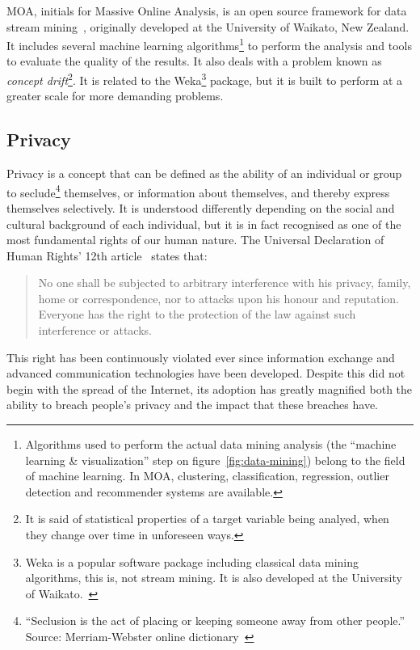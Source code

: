 MOA, initials for Massive Online Analysis, is an open source framework for data stream mining~\cite{website:MOA-Overview}, originally developed at the University of Waikato, New Zealand. It includes several machine learning algorithms\footnote{Algorithms used to perform the actual data mining analysis (the “machine learning \& visualization” step on figure~\ref{fig:data-mining}) belong to the field of machine learning. In MOA, clustering, classification, regression, outlier detection and recommender systems are available.} to perform the analysis and tools to evaluate the quality of the results. It also deals with a problem known as \textit{concept drift}\footnote{It is said of statistical properties of a target variable being analyed, when they change over time in unforeseen ways.}. It is related to the Weka\footnote{Weka is a popular software package including classical data mining algorithms, this is, not stream mining. It is also developed at the University of Waikato.~\cite{website:Weka}} package, but it is built to perform at a greater scale for more demanding problems.

\subsection{Privacy}

Privacy is a concept that can be defined as the ability of an individual or group to seclude\footnote{“Seclusion is the act of placing or keeping someone away from other people.” Source: Merriam-Webster online dictionary~\cite{website:merriamSeclusion}} themselves, or information about themselves, and thereby express themselves selectively. It is understood differently depending on the social and cultural background of each individual, but it is in fact recognised as one of the most fundamental rights of our human nature. The Universal Declaration of Human Rights’ 12th article~\cite{website:humanRights} states that:

\begin{quote}
No one shall be subjected to arbitrary interference with his privacy, family, home or correspondence, nor to attacks upon his honour and reputation. Everyone has the right to the protection of the law against such interference or attacks.
\end{quote}

This right has been continuously violated ever since information exchange and advanced communication technologies have been developed. Despite this did not begin with the spread of the Internet, its adoption has greatly magnified both the ability to breach people’s privacy and the impact that these breaches have.

